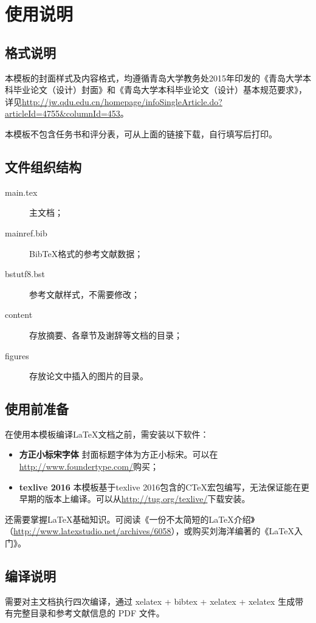 \chapter{使用说明}
\section{格式说明}
本模板的封面样式及内容格式，均遵循青岛大学教务处2015年印发的《青岛大学本科毕业论文（设计）封面》和《青岛大学本科毕业论文（设计）基本规范要求》，详见\url{http://jw.qdu.edu.cn/homepage/infoSingleArticle.do?articleId=4755&columnId=453}。

本模板不包含任务书和评分表，可从上面的链接下载，自行填写后打印。

\section{文件组织结构}
\begin{description}
\item[main.tex] 主文档；
\item[mainref.bib] BibTeX格式的参考文献数据；
\item[bstutf8.bst] 参考文献样式，不需要修改；
\item[content] 存放摘要、各章节及谢辞等文档的目录；
\item[figures] 存放论文中插入的图片的目录。
\end{description}
\section{使用前准备}
在使用本模板编译\LaTeX 文档之前，需安装以下软件：
\begin{itemize}
\item{\bf 方正小标宋字体} 封面标题字体为方正小标宋。可以在\url{http://www.foundertype.com/}购买；
\item{\bf texlive 2016} 本模板基于texlive 2016包含的CTeX宏包编写，无法保证能在更早期的版本上编译。可以从\url{http://tug.org/texlive/}下载安装。
\end{itemize}

还需要掌握\LaTeX 基础知识。可阅读《一份不太简短的\LaTeX 介绍》（\url{http://www.latexstudio.net/archives/6058}），或购买刘海洋编著的《\LaTeX 入门》。

\section{编译说明}
需要对主文档执行四次编译，通过 xelatex + bibtex + xelatex + xelatex 生成带有完整目录和参考文献信息的 PDF 文件。


